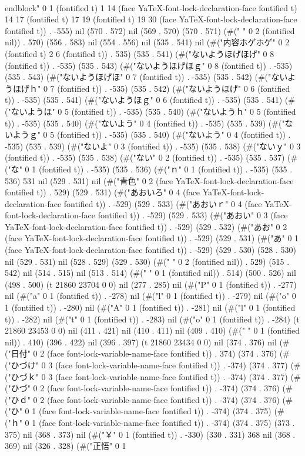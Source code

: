  \\end{block}" 0 1 (fontified t) 1 14 (face YaTeX-font-lock-declaration-face fontified t) 14 17 (fontified t) 17 19 (fontified t) 19 30 (face YaTeX-font-lock-declaration-face fontified t)) . -555) nil (570 . 572) nil (569 . 570) (570 . 571) (#("  " 0 2 (fontified nil)) . 570) (556 . 583) nil (554 . 556) nil (535 . 541) nil (#("内容ホゲホゲ" 0 2 (fontified t) 2 6 (fontified t)) . 535) (535 . 541) (#("ないようほげほげ" 0 8 (fontified t)) . -535) (535 . 543) (#("ないようほげほｇ" 0 8 (fontified t)) . -535) (535 . 543) (#("ないようほげほ" 0 7 (fontified t)) . -535) (535 . 542) (#("ないようほげｈ" 0 7 (fontified t)) . -535) (535 . 542) (#("ないようほげ" 0 6 (fontified t)) . -535) (535 . 541) (#("ないようほｇ" 0 6 (fontified t)) . -535) (535 . 541) (#("ないようほ" 0 5 (fontified t)) . -535) (535 . 540) (#("ないようｈ" 0 5 (fontified t)) . -535) (535 . 540) (#("ないよう" 0 4 (fontified t)) . -535) (535 . 539) (#("ないようｇ" 0 5 (fontified t)) . -535) (535 . 540) (#("ないよう" 0 4 (fontified t)) . -535) (535 . 539) (#("ないよ" 0 3 (fontified t)) . -535) (535 . 538) (#("ないｙ" 0 3 (fontified t)) . -535) (535 . 538) (#("ない" 0 2 (fontified t)) . -535) (535 . 537) (#("な" 0 1 (fontified t)) . -535) (535 . 536) (#("ｎ" 0 1 (fontified t)) . -535) (535 . 536) 531 nil (529 . 531) nil (#("青色" 0 2 (face YaTeX-font-lock-declaration-face fontified t)) . 529) (529 . 531) (#("あおいろ" 0 4 (face YaTeX-font-lock-declaration-face fontified t)) . -529) (529 . 533) (#("あおいｒ" 0 4 (face YaTeX-font-lock-declaration-face fontified t)) . -529) (529 . 533) (#("あおい" 0 3 (face YaTeX-font-lock-declaration-face fontified t)) . -529) (529 . 532) (#("あお" 0 2 (face YaTeX-font-lock-declaration-face fontified t)) . -529) (529 . 531) (#("あ" 0 1 (face YaTeX-font-lock-declaration-face fontified t)) . -529) (529 . 530) (528 . 530) nil (529 . 531) nil (528 . 529) (529 . 530) (#("  " 0 2 (fontified nil)) . 529) (515 . 542) nil (514 . 515) nil (513 . 514) (#(" " 0 1 (fontified nil)) . 514) (500 . 526) nil (498 . 500) (t 21860 23704 0 0) nil (277 . 285) nil (#("P" 0 1 (fontified t)) . -277) nil (#("a" 0 1 (fontified t)) . -278) nil (#("l" 0 1 (fontified t)) . -279) nil (#("o" 0 1 (fontified t)) . -280) nil (#("A" 0 1 (fontified t)) . -281) nil (#("l" 0 1 (fontified t)) . -282) nil (#("t" 0 1 (fontified t)) . -283) nil (#("o" 0 1 (fontified t)) . -284) (t 21860 23453 0 0) nil (411 . 421) nil (410 . 411) nil (409 . 410) (#(" " 0 1 (fontified nil)) . 410) (396 . 422) nil (396 . 397) (t 21860 23434 0 0) nil (374 . 376) nil (#("日付" 0 2 (face font-lock-variable-name-face fontified t)) . 374) (374 . 376) (#("ひづけ" 0 3 (face font-lock-variable-name-face fontified t)) . -374) (374 . 377) (#("ひづｋ" 0 3 (face font-lock-variable-name-face fontified t)) . -374) (374 . 377) (#("ひづ" 0 2 (face font-lock-variable-name-face fontified t)) . -374) (374 . 376) (#("ひｄ" 0 2 (face font-lock-variable-name-face fontified t)) . -374) (374 . 376) (#("ひ" 0 1 (face font-lock-variable-name-face fontified t)) . -374) (374 . 375) (#("ｈ" 0 1 (face font-lock-variable-name-face fontified t)) . -374) (374 . 375) (373 . 375) nil (368 . 373) nil (#("￥" 0 1 (fontified t)) . -330) (330 . 331) 368 nil (368 . 369) nil (326 . 328) (#("正悟" 0 1 